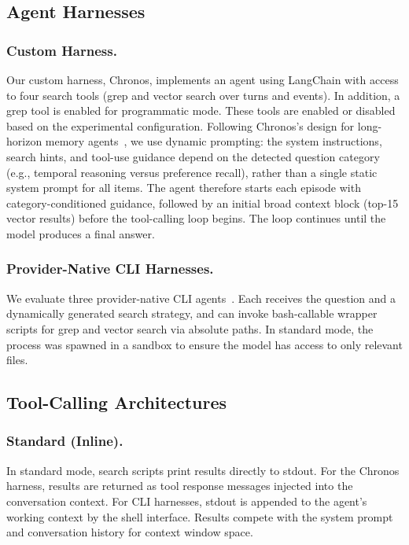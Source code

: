 \documentclass[sigconf,nonacm]{acmart}
\begin{document}
\subsection{Agent Harnesses}
\label{sec:method-harnesses}

\subsubsection{Custom Harness.}
Our custom harness, Chronos, implements an agent using LangChain with access to four search tools (grep and vector search over turns and events). In addition, a grep tool is enabled for programmatic mode. These tools are enabled or disabled based on the experimental configuration. Following Chronos's design for long-horizon memory agents~\cite{chronos}, we use dynamic prompting: the system instructions, search hints, and tool-use guidance depend on the detected question category (e.g., temporal reasoning versus preference recall), rather than a single static system prompt for all items. The agent therefore starts each episode with category-conditioned guidance, followed by an initial broad context block (top-15 vector results) before the tool-calling loop begins. The loop continues until the model produces a final answer.

 \subsubsection{Provider-Native CLI Harnesses.}
  We evaluate three provider-native CLI agents~\cite{yang2024sweagent}. Each receives the question and a dynamically generated search strategy, and can invoke bash-callable wrapper scripts for grep and
  vector search via absolute paths. In standard mode, the process was spawned in a sandbox to ensure the model has access to only relevant files.

\subsection{Tool-Calling Architectures}
\label{sec:toolcalling}

\subsubsection{Standard (Inline).}
In standard mode, search scripts print results directly to stdout. For the Chronos harness, results are returned as tool response messages injected into the conversation context. For CLI harnesses, stdout is appended to the agent's working context by the shell interface. Results compete with the system prompt and conversation history for context window space.
\end{document}

